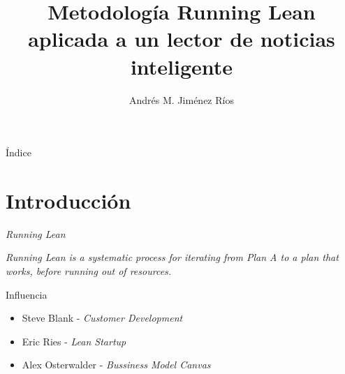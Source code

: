 \documentclass[12pt]{beamer}
\title{Metodología Running Lean aplicada a un lector de noticias inteligente}
\author{Andrés M. Jiménez Ríos}
\institute[TFM]{Trabajo Fin de Máster}
\begin{document}
	\frame{\titlepage}
	
	\begin{frame}{Índice}
		\tableofcontents
	\end{frame}

	\section{Introducción}	
		\begin{frame}{\textit{Running Lean}}
			\begin{block}{}
				\textit{Running Lean is a systematic process for iterating from Plan A to a plan that works, before running out of resources.}
			\end{block}
			\begin{block}{Influencia}
				\begin{itemize}
                    \item Steve Blank - \textit{Customer Development}
                    \item Eric Ries - \textit{Lean Startup}
                    \item Alex Osterwalder - \textit{Bussiness Model Canvas}
                \end{itemize}
			\end{block}
        \end{frame}

        {
            \begin{frame}[plain]
            \end{frame}
        }
	
\end{document}
